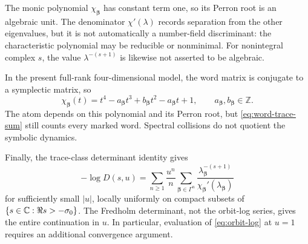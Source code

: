 The monic polynomial \(\chi_{\boldsymbol\beta}\) has constant term one,
so its Perron root is an algebraic unit.  The denominator
\(\chi'(\lambda)\) records separation from the other eigenvalues, but it is
not automatically a number-field discriminant: the characteristic
polynomial may be reducible or nonminimal.  For nonintegral complex \(s\),
the value \(\lambda^{-(s+1)}\) is likewise not asserted to be algebraic.

In the present full-rank four-dimensional model, the word matrix is
conjugate to a symplectic matrix, so
\begin{equation}
 \chi_{\boldsymbol\beta}(t)
 =t^4-a_{\boldsymbol\beta}t^3+b_{\boldsymbol\beta}t^2
 -a_{\boldsymbol\beta}t+1,
 \qquad a_{\boldsymbol\beta},b_{\boldsymbol\beta}\in\mathbb Z.
 \label{eq:reciprocal-polynomial}
\end{equation}
The atom depends on this polynomial and its Perron root, but
\eqref{eq:word-trace-sum} still counts every marked word.  Spectral
collisions do not quotient the symbolic dynamics.

Finally, the trace-class determinant identity gives
\begin{equation}
 -\log D(s,u)
 =\sum_{n\geq1}\frac{u^n}{n}
 \sum_{\boldsymbol\beta\in\Gamma^n}
 \frac{\lambda_{\boldsymbol\beta}^{-(s+1)}}
 {\chi_{\boldsymbol\beta}'(\lambda_{\boldsymbol\beta})}
 \label{eq:orbit-log}
\end{equation}
for sufficiently small \(|u|\), locally uniformly on compact subsets of
\(\{s\in\mathbb{C}:\Re s>-\sigma_0\}\).  The Fredholm determinant, not the orbit-log series, gives
the entire continuation in \(u\).  In particular, evaluation of
\eqref{eq:orbit-log} at \(u=1\) requires an additional convergence argument.
